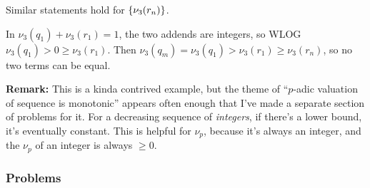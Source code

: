 \documentclass[11pt,paper=letter]{scrartcl}
\begin{document}
\begin{enumerate}
\begin{itemize}
\end{itemize}

Similar statements hold for $\left\{ \nu_3(r_n) \right\}$.

In $\nu_3(q_1) + \nu_3(r_1) = 1$, the two addends are integers, so WLOG $\nu_3(q_1) > 0 \ge \nu_3(r_1)$. Then $\nu_3(q_m) = \nu_3(q_1) > \nu_3(r_1) \ge \nu_3(r_n)$, so no two terms can be equal.

\textbf{Remark:} This is a kinda contrived example, but the theme of ``$p$-adic valuation of sequence is monotonic'' appears often enough that I've made a separate section of problems for it. For a decreasing sequence of \textit{integers}, if there's a lower bound, it's eventually constant. This is helpful for $\nu_p$, because it's always an integer, and the $\nu_p$ of an integer is always $\ge 0$.

\end{enumerate}

\newpage
\subsubsection*{Problems}
\end{document}
